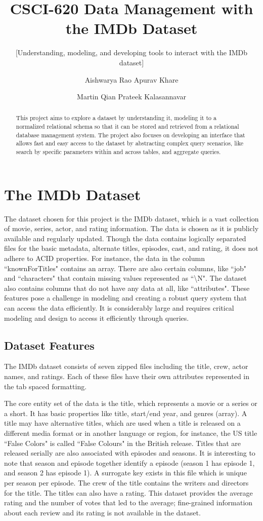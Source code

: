 \documentclass{sig-alternate}
\title{CSCI-620 Data Management with the IMDb Dataset}
\subtitle{[Understanding, modeling, and developing tools to interact with the IMDb dataset]}
\author
{
\alignauthor
  Aishwarya Rao
  \email{ar2711@rit.edu}
\alignauthor
  Apurav Khare
  \email{ak2816@rit.edu}
\and
\alignauthor
  Martin Qian
  \email{jq3513@rit.edu}
\alignauthor
  Prateek Kalasannavar
  \email{pk6685@rit.edu}
}
\begin{document}
\maketitle
\begin{abstract}
This project aims to explore a dataset by understanding it, modeling it to a normalized relational schema so that it can be stored and retrieved from a relational database management system. The project also focuses on developing an interface that allows fast and easy access to the dataset by abstracting complex query scenarios, like search by specific parameters within and across tables, and aggregate queries.
\end{abstract}

\section{The IMDb Dataset}
The dataset chosen for this project is the IMDb dataset, which is a vast collection of movie, series, actor, and rating information. The data is chosen as it is publicly available and regularly updated. Though the data contains logically separated files for the basic metadata, alternate titles, episodes, cast, and rating, it does not adhere to ACID properties. For instance, the data in the column ``knownForTitles" contains an array. There are also certain columns, like ``job" and ``characters" that contain missing values represented as ``\textbackslash N". The dataset also contains columns that do not have any data at all, like ``attributes". These features pose a challenge in modeling and creating a robust query system that can access the data efficiently. It is considerably large and requires critical modeling and design to access it efficiently through queries.
\subsection{Dataset Features}
The IMDb dataset consists of seven zipped files including the title, crew, actor names, and ratings. Each of these files have their own attributes represented in the tab spaced formatting.

The core entity set of the data is the title, which represents a movie or a series or a short. It has basic properties like title, start/end year, and genres (array). A title may have alternative titles, which are used when a title is released on a different media format or in another language or region, for instance, the US title ``False Colors" is called ``False Colours" in the British release. Titles that are released serially are also associated with episodes and seasons. It is interesting to note that season and episode together identify a episode (season 1 has episode 1, and season 2 has episode 1). A surrogate key exists in this file which is unique per season per episode. The crew of the title contains the writers and directors for the title. The titles can also have a rating. This dataset provides the average rating and the number of votes that led to the average; fine-grained information about each review and its rating is not available in the dataset.
\end{document}
